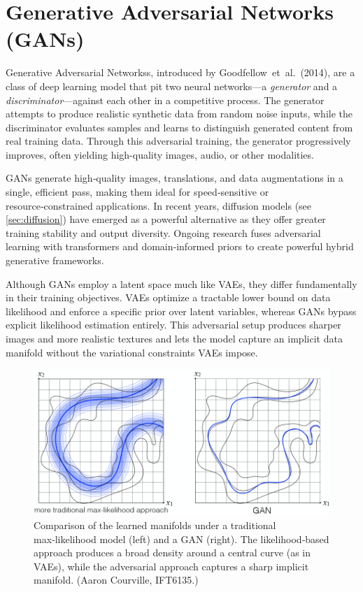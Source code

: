 \documentclass{article}
\begin{document}
\clearpage\newpage

\section{Generative Adversarial Networks (GANs)} \label{sec:gan}

Generative Adversarial Networkss, introduced by Goodfellow et al.\ (2014), are a class of deep learning model that pit two neural networks—a \emph{generator} and a \emph{discriminator}—against each other in a competitive process. The generator attempts to produce realistic synthetic data from random noise inputs, while the discriminator evaluates samples and learns to distinguish generated content from real training data. Through this adversarial training, the generator progressively improves, often yielding high-quality images, audio, or other modalities.

GANs generate high‑quality images, translations, and data augmentations in a single, efficient pass, making them ideal for speed‑sensitive or resource‑constrained applications. In recent years, diffusion models (see \ref{sec:diffusion}) have emerged as a powerful alternative as they offer greater training stability and output diversity. Ongoing research fuses adversarial learning with transformers and domain‑informed priors to create powerful hybrid generative frameworks.

Although GANs employ a latent space much like VAEs, they differ fundamentally in their training objectives. VAEs optimize a tractable lower bound on data likelihood and enforce a specific prior over latent variables, whereas GANs bypass explicit likelihood estimation entirely. This adversarial setup produces sharper images and more realistic textures and lets the model capture an implicit data manifold without the variational constraints VAEs impose.

\begin{figure}[ht]
    \centering
    \includegraphics[width=0.75\linewidth]{graphics/S9GAN/manifold_gan.png}
    \caption{Comparison of the learned manifolds under a traditional max‑likelihood model (left) and a GAN (right). The likelihood‑based approach produces a broad density around a central curve (as in VAEs), while the adversarial approach captures a sharp implicit manifold. (Aaron Courville, IFT6135.)}
    \label{fig:manifold_gan_vs_vae}
\end{figure}
\end{document}
